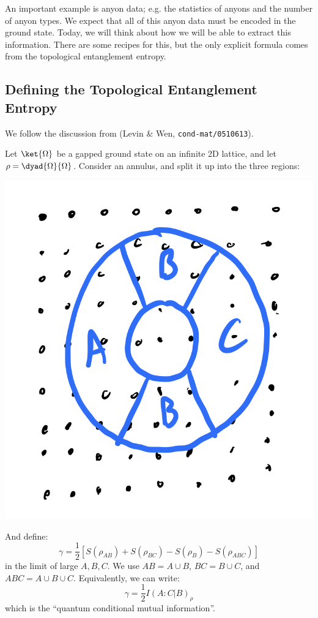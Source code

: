 An important example is anyon data; e.g. the statistics of anyons and the number of anyon types. We expect that all of this anyon data must be encoded in the ground state. Today, we will think about how we will be able to extract this information. There are some recipes for this, but the only explicit formula comes from the topological entanglement entropy.

\subsection{Defining the Topological Entanglement Entropy}
We follow the discussion from (Levin \& Wen, \texttt{cond-mat/0510613}). 

Let $\ket{\Omega}$ be a gapped ground state on an infinite 2D lattice, and let $\rho = \dyad{\Omega}{\Omega}$. Consider an annulus, and split it up into the three regions:

\begin{center}
    \includegraphics[scale=0.35]{Lectures/Images/lec17-TEE.png}
\end{center}

And define:
\begin{equation}
    \gamma = \frac{1}{2}\left[S(\rho_{AB}) + S(\rho_{BC}) - S(\rho_B) - S(\rho_{ABC})\right]
\end{equation}
in the limit of large $A, B, C$. We use $AB = A \cup B$, $BC = B \cup C$, and $ABC = A \cup B \cup C$. Equivalently, we can write:
\begin{equation}
    \gamma = \frac{1}{2}I(A:C\vert B)_\rho
\end{equation}
which is the ``quantum conditional mutual information''. 

